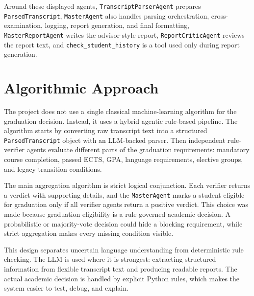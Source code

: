\documentclass[11pt,a4paper]{article}
\begin{document}
Around these displayed agents, \texttt{TranscriptParserAgent} prepares
\texttt{ParsedTranscript}, \texttt{MasterAgent} also handles parsing
orchestration, cross-examination, logging, report generation, and final
formatting, \texttt{MasterReportAgent} writes the advisor-style report,
\texttt{ReportCriticAgent} reviews the report text, and
\texttt{check\_student\_history} is a tool used only during report generation.

\section{Algorithmic Approach}

The project does not use a single classical machine-learning algorithm for the
graduation decision. Instead, it uses a hybrid agentic rule-based pipeline. The
algorithm starts by converting raw transcript text into a structured
\texttt{ParsedTranscript} object with an LLM-backed parser. Then independent
rule-verifier agents evaluate different parts of the graduation requirements:
mandatory course completion, passed ECTS, GPA, language requirements, elective
groups, and legacy transition conditions.

The main aggregation algorithm is strict logical conjunction. Each verifier
returns a verdict with supporting details, and the \texttt{MasterAgent} marks a
student eligible for graduation only if all verifier agents return a positive
verdict. This choice was made because graduation eligibility is a rule-governed
academic decision. A probabilistic or majority-vote decision could hide a
blocking requirement, while strict aggregation makes every missing condition
visible.

This design separates uncertain language understanding from deterministic rule
checking. The LLM is used where it is strongest: extracting structured
information from flexible transcript text and producing readable reports. The
actual academic decision is handled by explicit Python rules, which makes the
system easier to test, debug, and explain.
\end{document}
